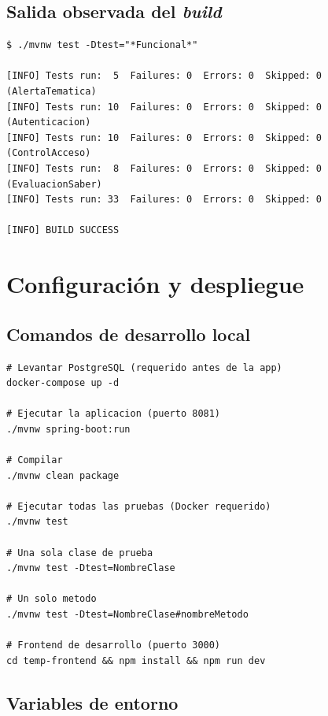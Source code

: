 \documentclass[11pt,a4paper,oneside]{article}
\begin{document}
\subsection{Salida observada del \emph{build}}

\begin{ataraExito}
\begin{lstlisting}[style=bash,basicstyle=\ttfamily\scriptsize]
$ ./mvnw test -Dtest="*Funcional*"

[INFO] Tests run:  5  Failures: 0  Errors: 0  Skipped: 0  (AlertaTematica)
[INFO] Tests run: 10  Failures: 0  Errors: 0  Skipped: 0  (Autenticacion)
[INFO] Tests run: 10  Failures: 0  Errors: 0  Skipped: 0  (ControlAcceso)
[INFO] Tests run:  8  Failures: 0  Errors: 0  Skipped: 0  (EvaluacionSaber)
[INFO] Tests run: 33  Failures: 0  Errors: 0  Skipped: 0

[INFO] BUILD SUCCESS
\end{lstlisting}
\end{ataraExito}

\section{Configuración y despliegue}

\subsection{Comandos de desarrollo local}

\begin{lstlisting}[style=bash,caption={Comandos esenciales}]
# Levantar PostgreSQL (requerido antes de la app)
docker-compose up -d

# Ejecutar la aplicacion (puerto 8081)
./mvnw spring-boot:run

# Compilar
./mvnw clean package

# Ejecutar todas las pruebas (Docker requerido)
./mvnw test

# Una sola clase de prueba
./mvnw test -Dtest=NombreClase

# Un solo metodo
./mvnw test -Dtest=NombreClase#nombreMetodo

# Frontend de desarrollo (puerto 3000)
cd temp-frontend && npm install && npm run dev
\end{lstlisting}

\subsection{Variables de entorno}
\end{document}
